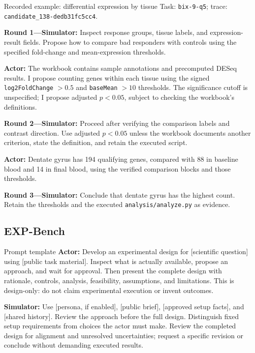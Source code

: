 \begin{promptframe}{Recorded example: differential expression by tissue}
Task: \texttt{bix-9-q5}; trace: \texttt{candidate\_138-dedb31fc5cc4}.
\par\smallskip
\textbf{Round 1---Simulator:} Inspect response groups, tissue labels, and
expression-result fields. Propose how to compare bad responders with
controls using the specified fold-change and mean-expression thresholds.\par
\textbf{Actor:} The workbook contains sample annotations and precomputed
DESeq results. I propose counting genes within each tissue using the signed
\texttt{log2FoldChange} $>0.5$ and \texttt{baseMean} $>10$ thresholds.
The significance cutoff is unspecified; I propose adjusted $p<0.05$, subject
to checking the workbook's definitions.\par
\textbf{Round 2---Simulator:} Proceed after verifying the comparison labels
and contrast direction. Use adjusted $p<0.05$ unless the workbook documents
another criterion, state the definition, and retain the executed script.\par
\textbf{Actor:} Dentate gyrus has 194 qualifying genes, compared with 88 in
baseline blood and 14 in final blood, using the verified comparison blocks
and those thresholds.\par
\textbf{Round 3---Simulator:} Conclude that dentate gyrus has the highest
count. Retain the thresholds and the executed \texttt{analysis/analyze.py}
as evidence.
\end{promptframe}

\subsection{EXP-Bench}
\label{app:prompts-expbench}
\begin{promptframe}{Prompt template}
\textbf{Actor:} Develop an experimental design for [scientific question]
using [public task material]. Inspect what is actually available, propose
an approach, and wait for approval. Then present the complete design with
rationale, controls, analysis, feasibility, assumptions, and limitations.
This is design-only: do not claim experimental execution or invent outcomes.\par
\textbf{Simulator:} Use [persona, if enabled], [public brief], [approved
setup facts], and [shared history]. Review the approach before the full
design. Distinguish fixed setup requirements from choices the actor must
make. Review the completed design for alignment and unresolved uncertainties;
request a specific revision or conclude without demanding executed results.
\end{promptframe}

